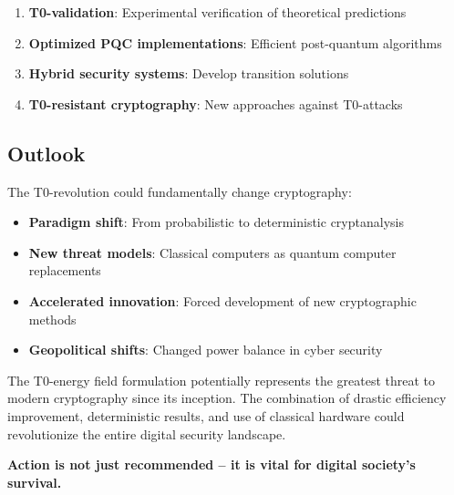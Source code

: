 \documentclass[12pt,a4paper]{article}
\begin{document}
	\begin{enumerate}
		\item \textbf{T0-validation}: Experimental verification of theoretical predictions
		\item \textbf{Optimized PQC implementations}: Efficient post-quantum algorithms
		\item \textbf{Hybrid security systems}: Develop transition solutions
		\item \textbf{T0-resistant cryptography}: New approaches against T0-attacks
	\end{enumerate}
	
	\subsection{Outlook}
	
	The T0-revolution could fundamentally change cryptography:
	
	\begin{itemize}
		\item \textbf{Paradigm shift}: From probabilistic to deterministic cryptanalysis
		\item \textbf{New threat models}: Classical computers as quantum computer replacements
		\item \textbf{Accelerated innovation}: Forced development of new cryptographic methods
		\item \textbf{Geopolitical shifts}: Changed power balance in cyber security
	\end{itemize}
	
	\begin{tcolorbox}[colback=blue!5!white,colframe=blue!75!black,title=Final Word]
		The T0-energy field formulation potentially represents the greatest threat to modern cryptography since its inception. The combination of drastic efficiency improvement, deterministic results, and use of classical hardware could revolutionize the entire digital security landscape.
		
		\textbf{Action is not just recommended -- it is vital for digital society's survival.}
	\end{tcolorbox}
	
\end{document}
